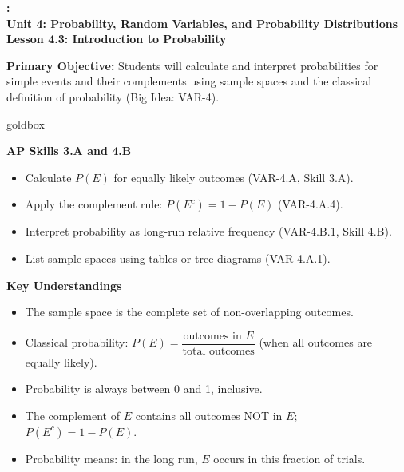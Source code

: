 \documentclass[10pt]{article}
\newcommand{\UnitNumberName}{Unit 4: Probability, Random Variables, and Probability Distributions \quad}
\newcommand{\LessonNumberName}{Lesson 4.3: Introduction to Probability}
\begin{document}
\begin{center}
    {\Large\bfseries \CourseName: \SchoolYear \\
    {\small\bfseries \UnitNumberName \LessonNumberName}}
\end{center}

\begin{tcolorbox}[colback=sky, colframe=navy, boxrule=0.9pt, arc=2mm,
    left=2mm, right=2mm, top=1.5mm, bottom=1.5mm]
    \textbf{Primary Objective:} Students will calculate and interpret probabilities for
    simple events and their complements using sample spaces and the classical definition
    of probability (Big Idea: VAR-4).
\end{tcolorbox}

\renewcommand{\arraystretch}{1.6}
\begin{skillbox}{goldbox}
\begin{minipage}[t]{0.48\linewidth}
    \textbf{AP Skills 3.A and 4.B}
    \begin{itemize}
        \item Calculate $P(E)$ for equally likely outcomes (VAR-4.A, Skill 3.A).
        \item Apply the complement rule: $P(E^c) = 1 - P(E)$ (VAR-4.A.4).
        \item Interpret probability as long-run relative frequency (VAR-4.B.1, Skill 4.B).
        \item List sample spaces using tables or tree diagrams (VAR-4.A.1).
    \end{itemize}
\end{minipage}
\hfill
\begin{minipage}[t]{0.48\linewidth}
    \textbf{Key Understandings}
    \begin{itemize}
        \item The sample space is the complete set of non-overlapping outcomes.
        \item Classical probability: $P(E) = \dfrac{\text{outcomes in }E}{\text{total outcomes}}$
              (when all outcomes are equally likely).
        \item Probability is always between 0 and 1, inclusive.
        \item The complement of $E$ contains all outcomes NOT in $E$; $P(E^c) = 1 - P(E)$.
        \item Probability means: in the long run, $E$ occurs in this fraction of trials.
    \end{itemize}
\end{minipage}
\end{skillbox}
\end{document}
